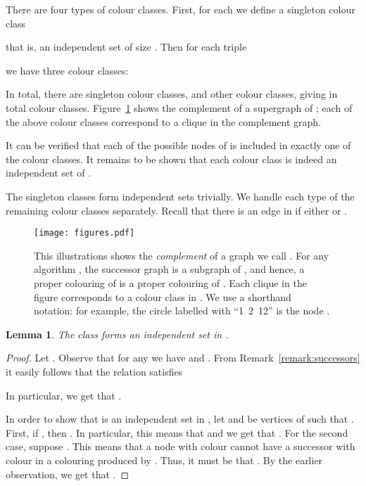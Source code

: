 \documentclass[a4paper,11pt]{article}
\newtheorem{lemma}[theorem]{Lemma}
\theoremstyle{remark}
\begin{document}
There are four types of colour classes. First, for each  we define a singleton colour class

that is, an independent set of size . Then for each triple

we have three colour classes:

In total, there are  singleton colour classes, and  other colour classes, giving in total  colour classes. Figure~\ref{fig:complement} shows the complement of a supergraph of ; each of the above colour classes correspond to a clique in the complement graph.

It can be verified that each of the  possible nodes of  is included in exactly one of the colour classes. It remains to be shown that each colour class is indeed an independent set of .

The singleton classes form independent sets trivially. We handle each type of the remaining colour classes separately. Recall that there is an edge  in  if either  or . 

\begin{figure}[p]
 \begin{center}
\texttt{[image: figures.pdf]}
 \end{center}
\caption{This illustrations shows the \emph{complement} of a graph we call . For any algorithm , the successor graph  is a subgraph of , and hence, a proper colouring of  is a proper colouring of . Each clique in the figure corresponds to a colour class in . We use a shorthand notation: for example, the circle labelled with ``1~2~12'' is the node . \label{fig:complement}}
\end{figure}

\begin{lemma}
 The class  forms an independent set in .
 \end{lemma}
\begin{proof}
 Let . Observe that for any  we have  and . From Remark~\ref{remark:successors} it easily follows that the relation  satisfies 

In particular, we get that .

In order to show that  is an independent set in , let  and  be vertices of  such that . First, if , then . In particular, this means that  and we get that . For the second case, suppose . This means that a node with colour  cannot have a successor with colour  in a colouring produced by . Thus, it must be that . By the earlier observation, we get that .
\end{proof}
\end{document}
